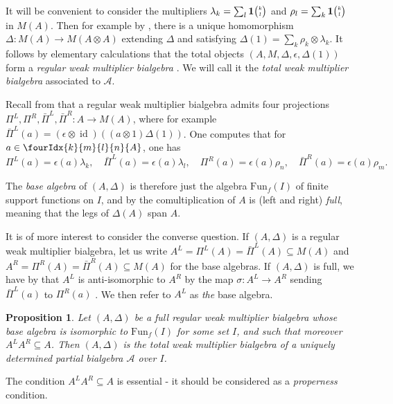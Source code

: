 \documentclass[10pt]{article}
\DeclareMathOperator{\id}{id}
\newcommand{\Fun}{\mathrm{Fun}}
\newcommand{\Grt}[3]{#1{\tiny {\begin{pmatrix} #2\\#3\end{pmatrix}}}}
\newcommand{\UnitC}[2]{\Grt{\mathbf{1}}{#1}{#2}}
\newcommand{\Gr}[5]{\fourIdx{#2}{#4}{#3}{#5}{#1}}%
\newtheorem{Prop}[Theorem]{Proposition}
\theoremstyle{definition}
\numberwithin{equation}{section}
\begin{document}
It will be convenient to consider the multipliers $\lambda_k = \sum_l \UnitC{k}{l}$ and $\rho_l = \sum_k\UnitC{k}{l}$ in $M(A)$. Then for example by \cite[Proposition A.3]{VDW2}, there is a unique homomorphism $\Delta:M(A)\rightarrow M(A\otimes A)$ extending $\Delta$ and satisfying $\Delta(1) = \sum_k \rho_k\otimes \lambda_k$. It follows by elementary calculations that the total objects $(A,M,\Delta,\epsilon,\Delta(1))$ form a \emph{regular weak multiplier bialgebra} \cite[Definition 2.1 and Definition 2.3]{Boh1}. We will call it the \emph{total weak multiplier bialgebra} associated to $\mathscr{A}$.

Recall from \cite[Section 3]{Boh1} that a regular weak multiplier
bialgebra admits four projections $\Pi^L,\Pi^R,\bar{\Pi}^L,\bar{\Pi}^R:A\rightarrow M(A)$, where for example  $\bar{\Pi}^L(a) = (\epsilon\otimes \id)((a\otimes
  1)\Delta(1))$. One computes that for $a\in \Gr{A}{k}{l}{m}{n}$, one has \[ \Pi^L(a) = \epsilon(a)\lambda_k,\quad \bar{\Pi}^L(a) = \epsilon(a) \lambda_l, \quad \Pi^R(a) = \epsilon(a) \rho_n,\quad \bar{\Pi}^R(a) = \epsilon(a)\rho_m.\]

The \emph{base algebra} of $(A,\Delta)$ is therefore just the algebra $\Fun_{f}(I)$ of finite support functions on $I$, and by \cite[Theorem 3.13]{Boh1} the comultiplication of $A$ is (left and right) \emph{full}, meaning that the legs of $\Delta(A)$ span $A$.

It is of more interest to consider the converse question. If $(A,\Delta)$ is a regular weak multiplier bialgebra, let us write $A^L = \Pi^L(A) = \bar{\Pi}^L(A)\subseteq M(A)$ and $A^R = \Pi^R(A)= \bar{\Pi}^R(A)\subseteq M(A)$ for the base algebras. If  $(A,\Delta)$ is full, we have by \cite[Lemma 4.8]{Boh1} that $A^L$ is anti-isomorphic to $A^R$ by the map $\sigma: A^L \rightarrow A^R$ sending $\bar{\Pi}^L(a)$ to $\Pi^R(a)$ . We then refer to $A^L$ as \emph{the} base algebra.

\begin{Prop}\label{PropCharPBA} Let $(A,\Delta)$ be a full regular weak multiplier bialgebra whose base algebra is isomorphic to $\Fun_f(I)$ for some set $I$, and such that moreover $A^LA^R \subseteq A$. Then $(A,\Delta)$ is the total weak multiplier bialgebra of a uniquely determined partial bialgebra $\mathscr{A}$ over $I$.
\end{Prop} 

The condition $A^LA^R \subseteq A$ is essential - it should be considered as a \emph{properness} condition. %
\end{document}
